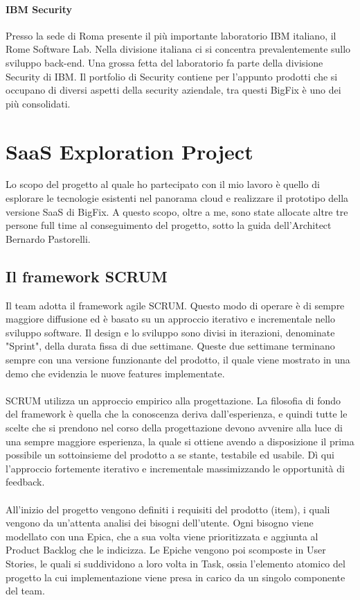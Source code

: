 \paragraph{IBM Security}
Presso la sede di Roma presente il più importante laboratorio IBM italiano, il Rome Software Lab. Nella divisione italiana ci si concentra prevalentemente sullo sviluppo back-end. Una grossa fetta del laboratorio fa parte della divisione Security di IBM. Il portfolio di Security contiene per l'appunto prodotti che si occupano di diversi aspetti della security aziendale, tra questi BigFix è uno dei più consolidati.

\section{SaaS Exploration Project}
Lo scopo del progetto al quale ho partecipato con il mio lavoro è quello di esplorare le tecnologie esistenti nel panorama cloud e realizzare il prototipo della versione SaaS di BigFix. A questo scopo, oltre a me, sono state allocate altre tre persone full time al conseguimento del progetto, sotto la guida dell'Architect Bernardo Pastorelli.

\subsection{Il framework SCRUM}
Il team adotta il framework agile SCRUM. Questo modo di operare è di sempre maggiore diffusione ed è basato su un approccio iterativo e incrementale nello sviluppo software. Il design e lo sviluppo sono divisi in iterazioni, denominate "Sprint", della durata fissa di due settimane. Queste due settimane terminano sempre con una versione funzionante del prodotto, il quale viene mostrato in una demo che evidenzia le nuove features implementate.
\paragraph{}
SCRUM utilizza un approccio empirico alla progettazione. La filosofia di fondo del framework è quella che la conoscenza deriva dall'esperienza, e quindi tutte le scelte che si prendono nel corso della progettazione devono avvenire alla luce di una sempre maggiore esperienza, la quale si ottiene avendo a disposizione il prima possibile un sottoinsieme del prodotto a se stante, testabile ed usabile. Dì qui l'approccio fortemente iterativo e incrementale massimizzando le opportunità di feedback. 
\paragraph{} 
All'inizio del progetto vengono definiti i requisiti del prodotto (item), i quali vengono da un'attenta analisi dei bisogni dell'utente. Ogni bisogno viene modellato con una Epica, che a sua volta viene prioritizzata e aggiunta al Product Backlog che le indicizza. Le Epiche vengono poi scomposte in User Stories, le quali si suddividono a loro volta in Task, ossia l'elemento atomico del progetto la cui implementazione viene presa in carico da un singolo componente del team.
